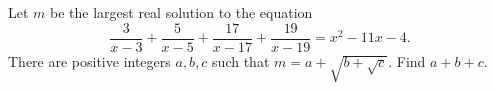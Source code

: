 Let $m$ be the largest real solution to the equation \[\frac{3}{x-3}+\frac{5}{x-5}+\frac{17}{x-17}+\frac{19}{x-19}=x^2-11x-4.\] There are positive integers $a,b,c$ such that $m=a+\sqrt{b+\sqrt{c}}$. Find $a+b+c$.